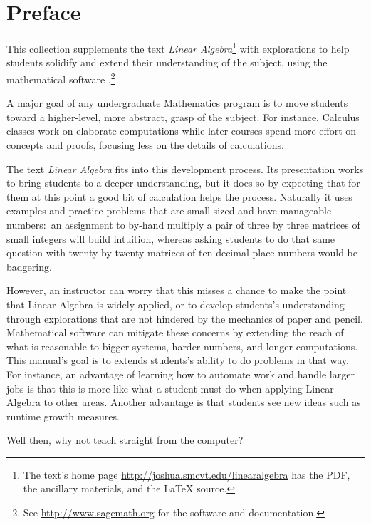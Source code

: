 \chapter*{Preface}\pagestyle{preface}\thispagestyle{preface}
\setlength{\parskip}{.25ex}


This collection supplements the text \nocite{Hefferon12}
\textit{Linear Algebra}\footnote{The text's home page 
\protect\url{http://joshua.smcvt.edu/linearalgebra} 
has the PDF, the ancillary materials, and the \protect\LaTeX{} source.}
with explorations to help students
solidify and extend their understanding of the subject, 
using the mathematical software \Sage{}.\footnote{See 
\url{http://www.sagemath.org} for the software and documentation.}

A major goal of any undergraduate Mathematics program is to move students 
toward a higher-level, more abstract, grasp of the subject.
For instance, Calculus classes work on elaborate computations
while later courses spend more effort on concepts and proofs, focusing
less on the details of calculations.  

The text \textit{Linear Algebra} fits into
this development process.
Its presentation works to bring students to a deeper understanding, 
but it does so by expecting
that for them at this point a good bit of calculation helps the process. 
Naturally it uses examples and practice problems
that are small-sized and have manageable numbers:~an 
assignment to by-hand multiply a pair of three by three matrices
of small integers will build intuition, whereas asking students to do that same 
question with twenty by twenty matrices
of ten decimal place numbers would be badgering. 

However, an instructor can worry that this misses a chance 
to make the point that Linear Algebra is widely applied,
or to develop students's understanding through explorations that are not 
hindered by the mechanics of paper and pencil. 
Mathematical software can mitigate these concerns by extending the reach of
what is reasonable 
to bigger systems, harder numbers, and longer computations.
This manual's goal is to extends students's ability to do problems in that way.
For instance, an advantage of learning how to automate work and
handle larger jobs is that 
this is more like what a student must do when applying Linear 
Algebra to other areas.
Another advantage is that students see new ideas such as 
runtime growth measures.

Well then, why 
not teach straight from the computer?

